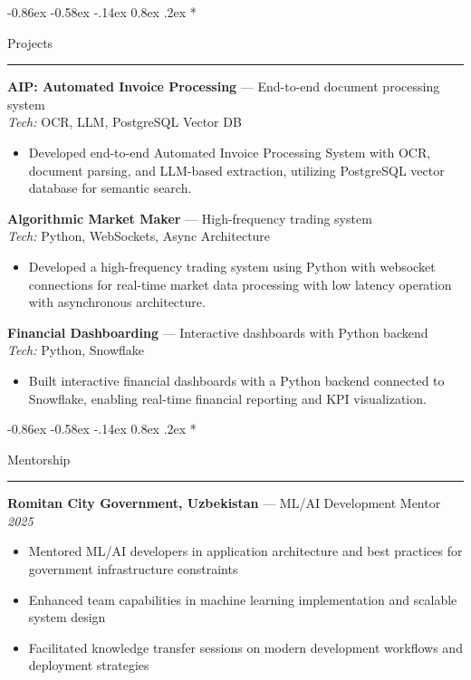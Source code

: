 \documentclass[10pt,letterpaper]{article}
\makeatletter
\renewcommand{\section}{\@startsection{section}{1}{\z@}%
  {-0.86ex \@plus -0.58ex \@minus -.14ex}%
  {0.8ex \@plus.2ex}%
  {\normalfont\large\bfseries}}
\makeatother
\begin{document}
\section*{Projects\strut}
\hrule\vspace{0.2em}

{\bfseries AIP: Automated Invoice Processing} — End-to-end document processing system \hfill \\
\emph{Tech:} OCR, LLM, PostgreSQL Vector DB\vspace{-0.2em}
\begin{itemize}
  \item Developed end-to-end Automated Invoice Processing System with OCR, document parsing, and LLM-based extraction, utilizing PostgreSQL vector database for semantic search.
\end{itemize}

{\bfseries Algorithmic Market Maker} — High-frequency trading system \hfill \\
\emph{Tech:} Python, WebSockets, Async Architecture\vspace{-0.2em}
\begin{itemize}
  \item Developed a high-frequency trading system using Python with websocket connections for real-time market data processing with low latency operation with asynchronous architecture.
\end{itemize}

{\bfseries Financial Dashboarding} — Interactive dashboards with Python backend \hfill \\
\emph{Tech:} Python, Snowflake\vspace{-0.2em}
\begin{itemize}
  \item Built interactive financial dashboards with a Python backend connected to Snowflake, enabling real-time financial reporting and KPI visualization.
\end{itemize}

\section*{Mentorship\strut}
\hrule\vspace{0.2em}

{\bfseries Romitan City Government, Uzbekistan} — ML/AI Development Mentor \hfill \textit{2025}\vspace{-0.2em}
\begin{itemize}
  \item Mentored ML/AI developers in application architecture and best practices for government infrastructure constraints
  \item Enhanced team capabilities in machine learning implementation and scalable system design
  \item Facilitated knowledge transfer sessions on modern development workflows and deployment strategies
\end{itemize}
\end{document}
